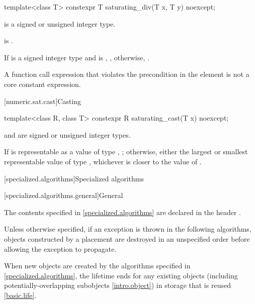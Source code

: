 %
\begin{itemdecl}
template<class T>
  constexpr T saturating_div(T x, T y) noexcept;
\end{itemdecl}

\begin{itemdescr}
\pnum
\constraints
{} is a signed or unsigned integer type.

\pnum
\expects
{} is .

\pnum
\returns
If  is a signed integer type
and  is ,
, otherwise, .

\pnum
\remarks
A function call expression
that violates the precondition in the  element
is not a core constant expression.
\end{itemdescr}

[numeric.sat.cast]{Casting}

%
\begin{itemdecl}
template<class R, class T>
  constexpr R saturating_cast(T x) noexcept;
\end{itemdecl}

\begin{itemdescr}
\pnum
\constraints
{} and  are signed or unsigned integer types.

\pnum
\returns
If  is representable as a value of type , ;
otherwise, either the largest or smallest representable value of type ,
whichever is closer to the value of .
\end{itemdescr}

[specialized.algorithms]{Specialized  algorithms}

[specialized.algorithms.general]{General}

\pnum
The contents specified in \ref{specialized.algorithms}
are declared in the header .

\pnum
Unless otherwise specified,
if an exception is thrown in the following algorithms,
objects constructed by a placement 
are destroyed in an unspecified order
before allowing the exception to propagate.

\pnum
\begin{note}
When new objects are created by
the algorithms specified in \ref{specialized.algorithms},
the lifetime ends for any existing objects
(including potentially-overlapping subobjects \ref{intro.object})
in storage that is reused \ref{basic.life}.
\end{note}

